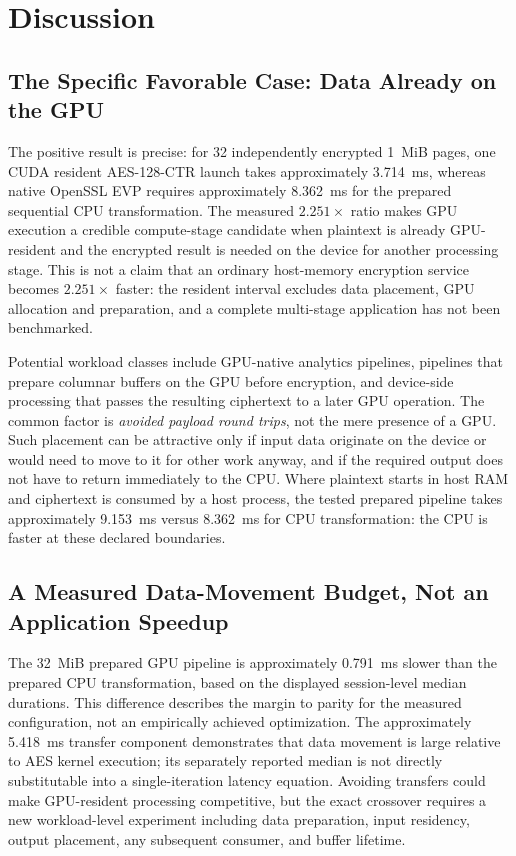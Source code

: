 \section{Discussion}
\label{sec:discussion}

\subsection{The Specific Favorable Case: Data Already on the GPU}
The positive result is precise: for 32 independently encrypted 1~MiB pages,
one CUDA resident AES-128-CTR launch takes approximately 3.714~ms, whereas
native OpenSSL EVP requires approximately 8.362~ms for the prepared sequential
CPU transformation. The measured $2.251\times$ ratio makes GPU execution a
credible compute-stage candidate when plaintext is already GPU-resident and
the encrypted result is needed on the device for another processing stage.
This is not a claim that an ordinary host-memory encryption service becomes
$2.251\times$ faster: the resident interval excludes data placement, GPU
allocation and preparation, and a complete multi-stage application has not
been benchmarked.

Potential workload classes include GPU-native analytics pipelines, pipelines
that prepare columnar buffers on the GPU before encryption, and device-side
processing that passes the resulting ciphertext to a later GPU operation.
The common factor is \emph{avoided payload round trips}, not the mere presence
of a GPU. Such placement can be attractive only if input data originate on the
device or would need to move to it for other work anyway, and if the required
output does not have to return immediately to the CPU. Where plaintext starts
in host RAM and ciphertext is consumed by a host process, the tested prepared
pipeline takes approximately 9.153~ms versus 8.362~ms for CPU transformation:
the CPU is faster at these declared boundaries.

\subsection{A Measured Data-Movement Budget, Not an Application Speedup}
The 32~MiB prepared GPU pipeline is approximately 0.791~ms slower than the
prepared CPU transformation, based on the displayed session-level median
durations. This difference describes the margin to parity for the measured
configuration, not an empirically achieved optimization. The approximately
5.418~ms transfer component demonstrates that data movement is large relative
to AES kernel execution; its separately reported median is not directly
substitutable into a single-iteration latency equation. Avoiding transfers
could make GPU-resident processing competitive, but the exact crossover
requires a new workload-level experiment including data preparation, input
residency, output placement, any subsequent consumer, and buffer lifetime.

